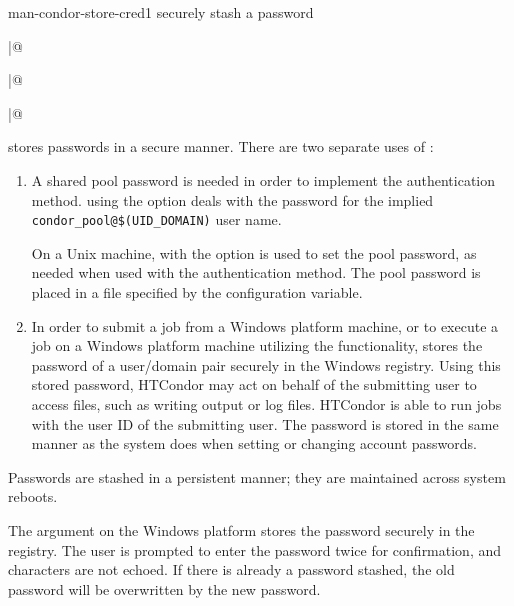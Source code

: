 \begin{ManPage}{}{man-condor-store-cred}{1}
{securely stash a password}

\Synopsis
{}

\Lbr
{} \verb@|@ 
\Rbr 
{}

\Lbr
{} \verb@|@ 
\Rbr 
{}

\Lbr
{} \verb@|@ 
\Rbr 
{}

\Description 

 stores passwords in a secure manner.
There are two separate uses of :
\begin{enumerate}
\item A shared pool password is needed in order to implement the 
 authentication method.
 using the  option deals with the
password for the implied \verb|condor_pool@$(UID_DOMAIN)| user name.

On a Unix machine, 
 with the  option is used to set
the pool password,
as needed when used with the  authentication method.
The pool password is placed in a file specified by 
the  configuration variable.

\item In order to submit a job from a Windows platform machine,
or to execute a job on a Windows platform machine utilizing the
 functionality, 
 stores the password
of a user/domain pair securely in the Windows registry.
Using this stored password, 
HTCondor may act on behalf of the submitting user to access files,
such as writing output or log files. 
HTCondor is able to
run jobs with the user ID of the submitting user.
The password is stored in the same manner as the system does when
setting or changing account passwords.
\end{enumerate}

Passwords are stashed in a persistent manner; they are maintained
across system reboots.

The  argument on the Windows platform 
stores the password securely in the registry.
The user is prompted to enter the password twice for confirmation, 
and characters are not echoed.
If there is already a password stashed,
the old password will be overwritten by the new password.


\end{ManPage}
